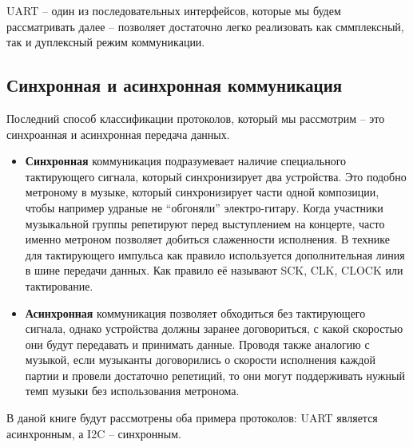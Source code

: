 \documentclass[../sparc.tex]{subfiles}
\begin{document}
\gls{UART} -- один из последовательных интерфейсов, которые мы будем
рассматривать далее -- позволяет достаточно легко реализовать как сммплексный,
так и дуплексный режим коммуникации.

\subsection{Синхронная и асинхронная коммуникация}

Последний способ классификации протоколов, который мы рассмотрим -- это
синхроанная и асинхронная передача данных.

\begin{itemize}
\item \textbf{Синхронная} коммуникация подразумевает наличие специального
  тактирующего сигнала, который синхронизирует два устройства.  Это подобно
  метроному в музыке, который синхронизирует части одной композиции, чтобы
  например удраные не ``обгоняли'' электро-гитару.  Когда участники музыкальной
  группы репетируют перед выступлением на концерте, часто именно метроном
  позволяет добиться слаженности исполнения.  В технике для тактирующего
  импульса как правило используется дополнительная линия в шине передачи данных.
  Как правило её называют SCK, CLK, CLOCK или тактирование.
\item \textbf{Асинхронная} коммуникация позволяет обходиться без тактирующего
  сигнала, однако устройства должны заранее договориться, с какой скоростью они
  будут передавать и принимать данные.  Проводя также аналогию с музыкой, если
  музыканты договорились о скорости исполнения каждой партии и провели
  достаточно репетиций, то они могут поддерживать нужный темп музыки без
  использования метронома.
\end{itemize}

В даной книге будут рассмотрены оба примера протоколов: \gls{UART} является
асинхронным, а \gls{I2C} -- синхронным.

\end{document}
